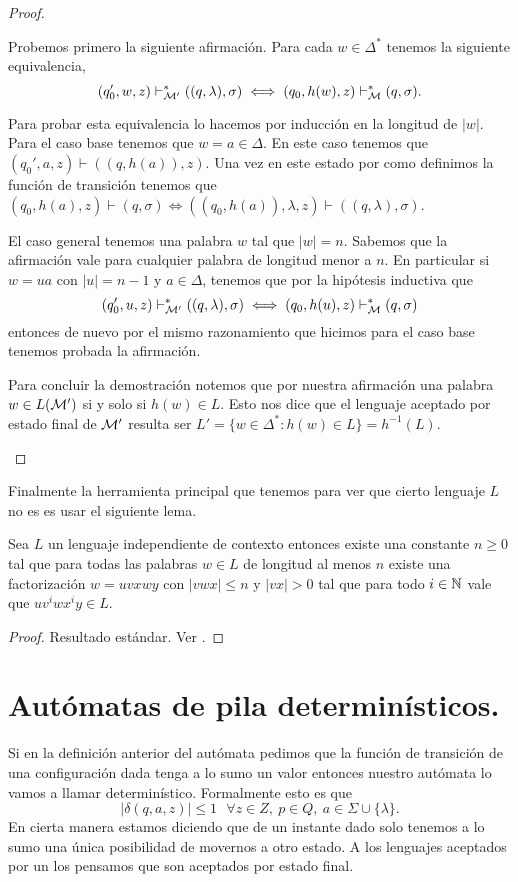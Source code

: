\documentclass[tesis.tex]{subfiles}
\begin{document}
\begin{proof}
\begin{enumerate}
		Probemos primero la siguiente afirmación.
		Para cada $w \in \Delta^*$ tenemos la siguiente equivalencia,
		\[
			(q_0',w,z) \vdash^*_{\cal M'} ((q,\lambda), \sigma) \iff (q_0,h(w), z) \vdash^*_{\cal M} (q, \sigma).
		\]
		
		Para probar esta equivalencia lo hacemos por inducción en la longitud de $|w|$.
		Para el caso base tenemos que $w = a \in \Delta$.
		En este caso tenemos que $(q_0', a, z) \vdash ((q,h(a)), z)$.
		Una vez en este estado por como definimos la función de transición tenemos que $ (q_0,h(a), z) \vdash (q, \sigma)  \iff ((q_0,h(a)), \lambda ,z) \vdash ((q,\lambda), \sigma)$.
		
		El caso general tenemos una palabra $w$ tal que $|w|=n$.
		Sabemos que la afirmación vale para cualquier palabra de longitud menor a $n$.
		En particular si $w=ua$ con $|u|=n-1$ y $a \in \Delta$, tenemos que por la hipótesis inductiva que 
		\[
		(q_0',u,z) \vdash^*_{\cal M'} ((q,\lambda), \sigma) \iff (q_0,h(u), z) \vdash^*_{\cal M} (q, \sigma)
		\]
		entonces de nuevo por el mismo razonamiento que hicimos para el caso base tenemos probada la afirmación.
		
		Para concluir la demostración notemos que por nuestra afirmación una palabra $w \in L(\cal M')$ si y solo si $h(w) \in L$. 
		Esto nos dice que el lenguaje aceptado por estado final de $\cal M'$ resulta ser $L' = \{ w \in \Delta^* : h(w) \in L \} = h^{-1}(L)$.
	\end{enumerate}
\end{proof}

Finalmente la herramienta principal que tenemos para ver que cierto lenguaje $L$ no es \ic es usar el siguiente lema.

\begin{lema}[Pumping] \label{pumping}
	Sea $L$ un lenguaje independiente de contexto entonces existe una constante $n \ge 0$ tal que para todas las palabras $w \in L$ de longitud al menos $n$ existe una factorización $w = uvxwy$ con $|vwx| \le n$ y $|vx| > 0$ tal que para todo $i \in \mathbb{N}$ vale que $uv^iwx^iy \in L$.
\end{lema}

\begin{proof}
	Resultado estándar. Ver \cite{hopcraft-ullman}.
\end{proof}

\section{Autómatas de pila determinísticos.} 
Si en la definición anterior del autómata pedimos que la función de transición de una configuración dada tenga a lo sumo un valor entonces nuestro autómata lo vamos a llamar determinístico. 
Formalmente esto es que 
\[
|\delta(q,a, z)| \le 1 \ \ \ \forall z \in Z, \ p \in Q, \ a \in \Sigma \cup \{ \lambda \}.
\]
En cierta manera estamos diciendo que de un instante dado solo tenemos a lo sumo una única posibilidad de movernos a otro estado. 
A los lenguajes aceptados por un \APD los pensamos que son aceptados por estado final.
\end{document}
